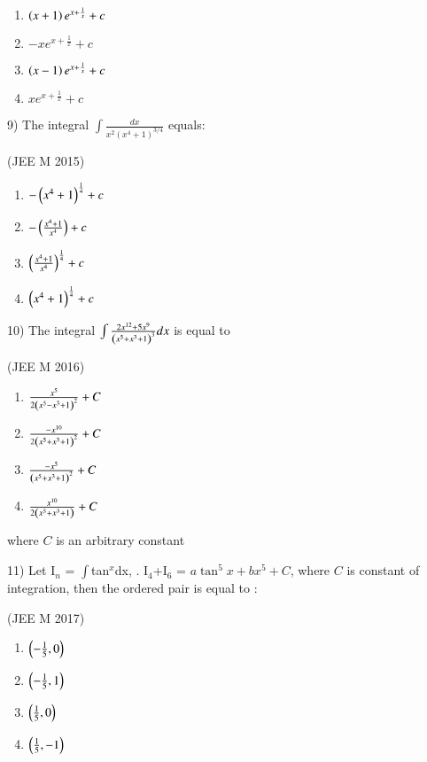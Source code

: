 \documentclass[journal,12pt,twocolumn]{IEEEtran}
\theoremstyle{remark}
\begin{document}
		\begin{multicols}{2}
			\begin{enumerate}
				\item $\left(x+1\right)e^{x+\frac{1}{x}}+c$
				\item $-xe^{x+\frac{1}{x}}+c$
				\item $\left(x-1\right)e^{x+\frac{1}{x}}+c$
				\item $xe^{x+\frac{1}{x}}+c$
			\end{enumerate}
		\end{multicols}

9)
	 The integral $\int\frac{dx}{x^2(x^4+1)^{3/4}}$ equals:

		\hfill{(JEE M 2015)}

		\begin{multicols}{2}
			\begin{enumerate}
				\item $-\left(x^4+1\right)^{\frac{1}{4}}+c$
				\item $-\left(\frac{x^4+1}{x^4}\right)+c$
				\item $\left(\frac{x^4+1}{x^4}\right)^{\frac{1}{4}}+c$
				\item $\left(x^4+1\right)^{\frac{1}{4}}+c$
			\end{enumerate}
		\end{multicols}

10)
	 The integral $\int\frac{2x^{12}+5x^9}{\left(x^5+x^3+1\right)^3}dx$ is equal to

		\hfill{(JEE M 2016)}

		\begin{multicols}{2}
			\begin{enumerate}
				\item $\frac{x^5}{2\left(x^5-x^3+1\right)^2}+C$
				\item $\frac{-x^{10}}{2\left(x^5+x^3+1\right)^2}+C$
				\item $\frac{-x^5}{\left(x^5+x^3+1\right)^2}+C$
				\item $\frac{x^{10}}{2\left(x^5+x^3+1\right)}+C$
			\end{enumerate}
		\end{multicols}
		where $C$ is an arbitrary constant

11)
	 Let I$_n$ = $\int$tan$^x$dx, . I$_4$+I$_6$ = $a \tan^5x + bx^5 + C$, where $C$ is constant of integration, then the ordered pair  is equal to :

		\hfill{(JEE M 2017)}

		\begin{multicols}{4}
			\begin{enumerate}
				\item$\left(-\frac{1}{5}, 0\right)$
					
				\item$\left(-\frac{1}{5}, 1\right)$
					
				\item$\left(\frac{1}{5}, 0\right)$
					
				\item$\left(\frac{1}{5}, -1\right)$
			\end{enumerate}
		\end{multicols}
		
\end{document}
